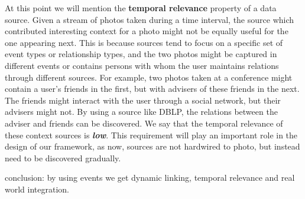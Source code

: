 At this point we will mention the \textbf{temporal relevance} property of a data source. Given a stream of photos taken during a time interval, the source which contributed interesting context for a photo might not be equally useful for the one appearing next. This is because sources tend to focus on a specific set of event types or relationship types, and the two photos might be captured in different events or contains persons with whom the user maintains relations through different sources. For example, two photos taken at a conference might contain a user's friends in the first, but with advisers of these friends in the next. The friends might interact with the user through a social network, but their advisers might not. By using a source like DBLP, the relations between the adviser and friends can be discovered. We say that the temporal relevance of these context sources is \textbf{\textit{low}}. This requirement will play an important role in the design of our framework, as now, sources are not hardwired to photo, but instead need to be discovered gradually.

conclusion: by using events we get dynamic linking, temporal relevance and real world integration.




